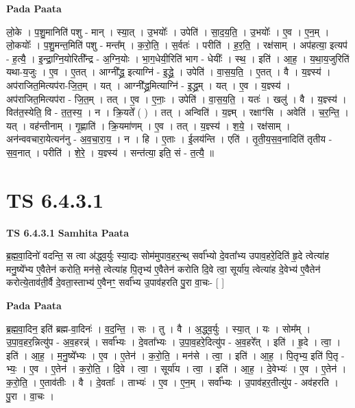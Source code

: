 \documentclass[17pt]{extarticle}
\begin{document}
\textbf{Pada Paata} \newline

लो॒के । प॒शु॒मानिति॑ पशु - मान् । स्या॒त् । उ॒भयोः᳚ । उपेति॑ । सा॒द॒य॒ति॒ । उ॒भयोः᳚ । ए॒व । ए॒न॒म् । लो॒कयोः᳚ । प॒शु॒मन्त॒मिति॑ पशु - मन्त᳚म् । क॒रो॒ति॒ । स॒र्वतः॑ । परीति॑ । ह॒र॒ति॒ । रक्ष॑साम् । अप॑हत्या॒ इत्यप॑ - ह॒त्यै॒ । इ॒न्द्रा॒ग्नि॒योरिती᳚न्द्र - अ॒ग्नि॒योः । भा॒ग॒धेयी॒रिति॑ भाग - धेयीः᳚ । स्थ॒ । इति॑ । आ॒ह॒ । य॒था॒य॒जुरिति॑ यथा-य॒जुः । ए॒व । ए॒तत् । आग्नी᳚द्ध्र॒ इत्याग्नि॑ - इ॒द्ध्रे॒ । उपेति॑ । वा॒स॒य॒ति॒ । ए॒तत् । वै । य॒ज्ञ्स्य॑ । अप॑राजित॒मित्यप॑रा-जि॒त॒म् । यत् । आग्नी᳚द्ध्र॒मित्याग्नि॑ - इ॒द्ध्र॒म् । यत् । ए॒व । य॒ज्ञ्स्य॑ । अप॑राजित॒मित्यप॑रा - जि॒त॒म् । तत् । ए॒व । ए॒नाः॒ । उपेति॑ । वा॒स॒य॒ति॒ । यतः॑ । खलु॑ । वै । य॒ज्ञ्स्य॑ । वित॑त॒स्येति॒ वि - त॒त॒स्य॒ । न । क्रि॒यते᳚ ( ) । तत् । अन्विति॑ । य॒ज्ञ्म् । रक्षाꣳ॑सि । अवेति॑ । च॒र॒न्ति॒ । यत् । वह॑न्तीनाम् । गृ॒ह्णाति॑ । क्रि॒यमा॑णम् । ए॒व । तत् । य॒ज्ञ्स्य॑ । श॒ये॒ । रक्ष॑साम् । अन॑न्ववचारा॒येत्यन॑नु - अ॒व॒चा॒रा॒य॒ । न । हि । ए॒ताः । ई॒लय॑न्ति । एति॑ । तृ॒ती॒य॒स॒व॒नादिति॑ तृतीय - स॒व॒नात् । परीति॑ । शे॒रे॒ । य॒ज्ञ्स्य॑ । सन्त॑त्या॒ इति॒ सं - त॒त्यै॒ ॥  \newline




\section*{ TS 6.4.3.1 }

\textbf{TS 6.4.3.1 } \newline
\textbf{Samhita Paata} \newline

ब्र॒ह्म॒वा॒दिनो॑ वदन्ति॒ स त्वा अ॑द्ध्व॒र्युः स्या॒द्यः सोम॑मुपाव॒हर॒न्थ् सर्वा᳚भ्यो दे॒वता᳚भ्य उपाव॒हरे॒दिति॑ हृ॒दे त्वेत्या॑ह मनु॒ष्ये᳚भ्य ए॒वैतेन॑ करोति॒ मन॑से॒ त्वेत्या॑ह पि॒तृभ्य॑ ए॒वैतेन॑ करोति दि॒वे त्वा॒ सूर्या॑य॒ त्वेत्या॑ह दे॒वेभ्य॑ ए॒वैतेन॑ करोत्ये॒ताव॑ती॒र्वै दे॒वता॒स्ताभ्य॑ ए॒वैनꣳ॒॒ सर्वा᳚भ्य उ॒पाव॑हरति पु॒रा वा॒चः- [  ] \newline

\textbf{Pada Paata} \newline

ब्र॒ह्म॒वा॒दिन॒ इति॑ ब्रह्म-वा॒दिनः॑ । व॒द॒न्ति॒ । सः । तु । वै । अ॒द्ध्व॒र्युः । स्या॒त् । यः । सोम᳚म् । उ॒पा॒व॒हर॒न्नित्यु॑प - अ॒व॒हरन्न्॑ । सर्वा᳚भ्यः । दे॒वता᳚भ्यः । उ॒पा॒व॒हरे॒दित्यु॑प - अ॒व॒हरे᳚त् । इति॑ । हृ॒दे । त्वा॒ । इति॑ । आ॒ह॒ । म॒नु॒ष्ये᳚भ्यः । ए॒व । ए॒तेन॑ । क॒रो॒ति॒ । मन॑से । त्वा॒ । इति॑ । आ॒ह॒ । पि॒तृभ्य॒ इति॑ पि॒तृ - भ्यः॒ । ए॒व । ए॒तेन॑ । क॒रो॒ति॒ । दि॒वे । त्वा॒ । सूर्या॑य । त्वा॒ । इति॑ । आ॒ह॒ । दे॒वेभ्यः॑ । ए॒व । ए॒तेन॑ । क॒रो॒ति॒ । ए॒ताव॑तीः । वै । दे॒वताः᳚ । ताभ्यः॑ । ए॒व । ए॒न॒म् । सर्वा᳚भ्यः । उ॒पाव॑हर॒तीत्यु॑प - अव॑हरति । पु॒रा । वा॒चः ।  \newline
\end{document}
